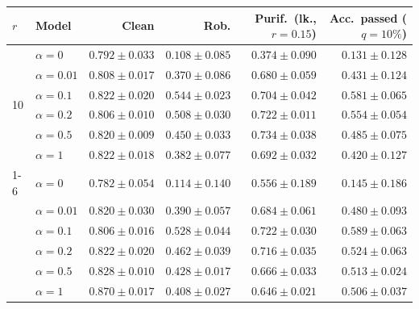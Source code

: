 \begin{tabular}{@{}llrrrr@{}}
\toprule
$r$ & Model & Clean & Rob. & Purif.\ (lk., $r{=}0.15$) & Acc.\ passed ($q{=}10\%$) \\
\midrule
\multirow{6}{*}{10} & $\alpha{=}0$ & $0.792 \pm 0.033$ & $0.108 \pm 0.085$ & $0.374 \pm 0.090$ & $0.131 \pm 0.128$ \\
 & $\alpha{=}0.01$ & $0.808 \pm 0.017$ & $0.370 \pm 0.086$ & $0.680 \pm 0.059$ & $0.431 \pm 0.124$ \\
 & $\alpha{=}0.1$ & $0.822 \pm 0.020$ & $\mathbf{0.544 \pm 0.023}$ & $0.704 \pm 0.042$ & $0.581 \pm 0.065$ \\
 & $\alpha{=}0.2$ & $0.806 \pm 0.010$ & $0.508 \pm 0.030$ & $0.722 \pm 0.011$ & $0.554 \pm 0.054$ \\
 & $\alpha{=}0.5$ & $0.820 \pm 0.009$ & $0.450 \pm 0.033$ & $\mathbf{0.734 \pm 0.038}$ & $0.485 \pm 0.075$ \\
 & $\alpha{=}1$ & $0.822 \pm 0.018$ & $0.382 \pm 0.077$ & $0.692 \pm 0.032$ & $0.420 \pm 0.127$ \\
\cmidrule(lr){1-6}
\multirow{6}{*}{20} & $\alpha{=}0$ & $0.782 \pm 0.054$ & $0.114 \pm 0.140$ & $0.556 \pm 0.189$ & $0.145 \pm 0.186$ \\
 & $\alpha{=}0.01$ & $0.820 \pm 0.030$ & $0.390 \pm 0.057$ & $0.684 \pm 0.061$ & $0.480 \pm 0.093$ \\
 & $\alpha{=}0.1$ & $0.806 \pm 0.016$ & $0.528 \pm 0.044$ & $0.722 \pm 0.030$ & $\mathbf{0.589 \pm 0.063}$ \\
 & $\alpha{=}0.2$ & $0.822 \pm 0.020$ & $0.462 \pm 0.039$ & $0.716 \pm 0.035$ & $0.524 \pm 0.063$ \\
 & $\alpha{=}0.5$ & $0.828 \pm 0.010$ & $0.428 \pm 0.017$ & $0.666 \pm 0.033$ & $0.513 \pm 0.024$ \\
 & $\alpha{=}1$ & $\mathbf{0.870 \pm 0.017}$ & $0.408 \pm 0.027$ & $0.646 \pm 0.021$ & $0.506 \pm 0.037$ \\
\bottomrule
\end{tabular}
